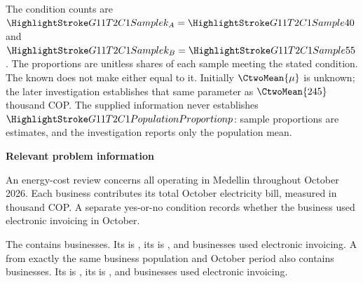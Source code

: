 The condition counts are $\Sam{k_A}=\Sam{40}$ and $\Sam{k_B}=\Sam{55}$. The proportions are unitless shares of each sample meeting the stated condition. The known  does not make either  equal to it. Initially $\CtwoMean{\mu}$ is unknown; the later investigation establishes that same parameter as $\CtwoMean{245}$ thousand COP. The supplied information never establishes $\PP{p}$: sample proportions are estimates, and the investigation reports only the population mean.

\secInicio[][sec:p1]

\clearpage



\textbf{Relevant problem information}

\begin{probleminfoexcerpt}
An energy-cost review concerns all     operating in Medellin throughout October 2026. Each business contributes its total October electricity bill, measured in thousand COP. A separate yes-or-no condition records whether the business used electronic invoicing in October.
\end{probleminfoexcerpt}

\begin{probleminfoexcerpt}
The     contains  businesses. Its   is   , its    is   , and  businesses used electronic invoicing. A     from exactly the same business population and October period also contains  businesses. Its   is   , its    is   , and  businesses used electronic invoicing.
\end{probleminfoexcerpt}



